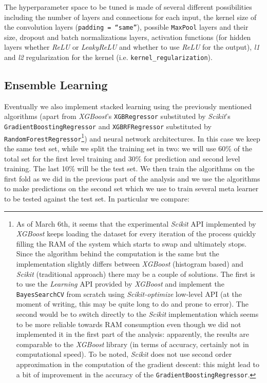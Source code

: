     The hyperparameter space to be tuned is made of several different possibilities including the number of layers and connections for each input, the kernel size of the convolution layers (\texttt{padding = ``same''}), possible \texttt{MaxPool} layers and their size, dropout and batch normalizations layers, activation functions (for hidden layers whether \textit{ReLU} or \textit{LeakyReLU} and whether to use \textit{ReLU} for the output), \textit{l1} and \textit{l2} regularization for the kernel (i.e. \texttt{kernel\_regularization}). 
    
\subsection{Ensemble Learning}
    Eventually we also implement stacked learning using the previously mentioned algorithms (apart from \textit{XGBoost}'s \texttt{XGBRegressor} substituted by \textit{Scikit}'s \texttt{GradientBoostingRegressor} and \texttt{XGBRFRegressor} substituted by \texttt{RandomForestRegressor}\footnote{As of March 6th, it seems that the experimental \textit{Scikit} API implemented by \textit{XGBoost} keeps loading the dataset for every iteration of the process quickly filling the RAM of the system which starts to swap and ultimately stops. Since the algorithm behind the computation is the same but the implementation slightly differs between \textit{XGBoost} (histogram based) and \textit{Scikit} (traditional approach) there may be a couple of solutions. The first is to use the \textit{Learning} API provided by \textit{XGBoost} and implement the \texttt{BayesSearchCV} from scratch using \textit{Scikit-optimize} low-level API (at the moment of writing, this may be quite long to do and prone to error). The second would be to switch directly to the \textit{Scikit} implementation which seems to be more reliable towards RAM consumption even though we did not implemented it in the first part of the analysis: apparently, the results are comparable to the \textit{XGBoost} library (in terms of accuracy, certainly not in computational speed). To be noted, \textit{Scikit} does not use second order approximation in the computation of the gradient descent: this might lead to a bit of improvement in the accuracy of the \texttt{GradientBoostingRegressor}.}) and neural network architectures. In this case we keep the same test set, while we split the training set in two: we will use 60\% of the total set for the first level training and 30\% for prediction and second level training. The last 10\% will be the test set. We then train the algorithms on the first fold as we did in the previous part of the analysis and we use the algorithms to make predictions on the second set which we use to train several meta learner to be tested against the test set. In particular we compare:
